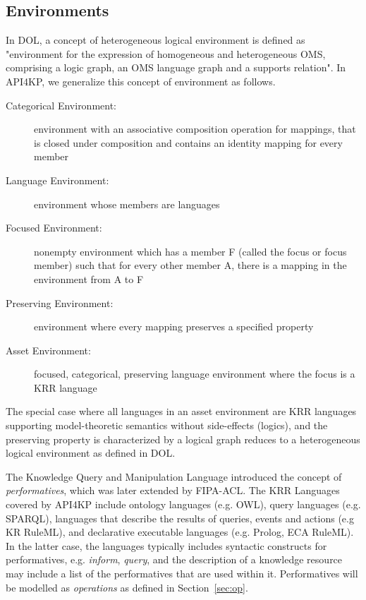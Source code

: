 \documentclass[runningheads]{llncs}
\begin{document}
\subsection{Environments}
In DOL, a concept of heterogeneous logical environment is defined as 
"environment for the
expression of homogeneous and heterogeneous OMS, comprising
a logic graph, an OMS language graph and a supports relation".
In API4KP, we generalize this concept of environment as follows.
\label{krassetenv}
\begin{description}
\item[Categorical Environment:] environment with an associative composition operation for mappings, that is closed under composition and contains an identity mapping for every member
\item[Language Environment:] environment whose members are languages
\item[Focused Environment:] nonempty environment which has a member F (called the focus or focus member) such that for every other member A, there is a mapping in the environment from A to F
\item[Preserving Environment:] environment where every mapping preserves a specified property
\item[Asset Environment:] focused, categorical, preserving language environment where the focus is a KRR language
\end{description}
The special case where all languages in an asset environment are KRR languages supporting model-theoretic semantics without side-effects (logics), and the preserving property is characterized by a logical graph reduces to a heterogeneous logical environment as defined in DOL.

The Knowledge Query and Manipulation Language\cite{Finin:1994:KAC:191246.191322} introduced the concept of \emph{performatives}, which was later extended by FIPA-ACL\cite{FIPA-ACL}.
The KRR Languages covered by API4KP include ontology languages (e.g. OWL), query languages (e.g. SPARQL), languages that describe the results of queries, events and actions (e.g KR RuleML), and declarative executable languages (e.g. Prolog, ECA RuleML). In the latter case, the languages typically includes syntactic constructs for performatives, e.g. \emph{inform}, \emph{query}, and the description of a knowledge resource may include a list of the performatives that are used within it.  Performatives will be modelled as \emph{operations} as defined in Section~\ref{sec:op}.
\end{document}
